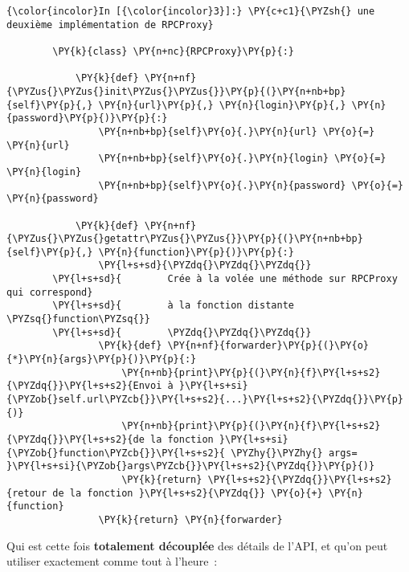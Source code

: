     \begin{Verbatim}[commandchars=\\\{\}]
{\color{incolor}In [{\color{incolor}3}]:} \PY{c+c1}{\PYZsh{} une deuxième implémentation de RPCProxy}
        
        \PY{k}{class} \PY{n+nc}{RPCProxy}\PY{p}{:}
            
            \PY{k}{def} \PY{n+nf}{\PYZus{}\PYZus{}init\PYZus{}\PYZus{}}\PY{p}{(}\PY{n+nb+bp}{self}\PY{p}{,} \PY{n}{url}\PY{p}{,} \PY{n}{login}\PY{p}{,} \PY{n}{password}\PY{p}{)}\PY{p}{:}
                \PY{n+nb+bp}{self}\PY{o}{.}\PY{n}{url} \PY{o}{=} \PY{n}{url}
                \PY{n+nb+bp}{self}\PY{o}{.}\PY{n}{login} \PY{o}{=} \PY{n}{login}
                \PY{n+nb+bp}{self}\PY{o}{.}\PY{n}{password} \PY{o}{=} \PY{n}{password}
                
            \PY{k}{def} \PY{n+nf}{\PYZus{}\PYZus{}getattr\PYZus{}\PYZus{}}\PY{p}{(}\PY{n+nb+bp}{self}\PY{p}{,} \PY{n}{function}\PY{p}{)}\PY{p}{:}
                \PY{l+s+sd}{\PYZdq{}\PYZdq{}\PYZdq{}}
        \PY{l+s+sd}{        Crée à la volée une méthode sur RPCProxy qui correspond}
        \PY{l+s+sd}{        à la fonction distante \PYZsq{}function\PYZsq{}}
        \PY{l+s+sd}{        \PYZdq{}\PYZdq{}\PYZdq{}}
                \PY{k}{def} \PY{n+nf}{forwarder}\PY{p}{(}\PY{o}{*}\PY{n}{args}\PY{p}{)}\PY{p}{:}
                    \PY{n+nb}{print}\PY{p}{(}\PY{n}{f}\PY{l+s+s2}{\PYZdq{}}\PY{l+s+s2}{Envoi à }\PY{l+s+si}{\PYZob{}self.url\PYZcb{}}\PY{l+s+s2}{...}\PY{l+s+s2}{\PYZdq{}}\PY{p}{)}
                    \PY{n+nb}{print}\PY{p}{(}\PY{n}{f}\PY{l+s+s2}{\PYZdq{}}\PY{l+s+s2}{de la fonction }\PY{l+s+si}{\PYZob{}function\PYZcb{}}\PY{l+s+s2}{ \PYZhy{}\PYZhy{} args= }\PY{l+s+si}{\PYZob{}args\PYZcb{}}\PY{l+s+s2}{\PYZdq{}}\PY{p}{)}
                    \PY{k}{return} \PY{l+s+s2}{\PYZdq{}}\PY{l+s+s2}{retour de la fonction }\PY{l+s+s2}{\PYZdq{}} \PY{o}{+} \PY{n}{function}
                \PY{k}{return} \PY{n}{forwarder}
\end{Verbatim}


    Qui est cette fois \textbf{totalement découplée} des détails de l'API,
et qu'on peut utiliser exactement comme tout à l'heure~:

